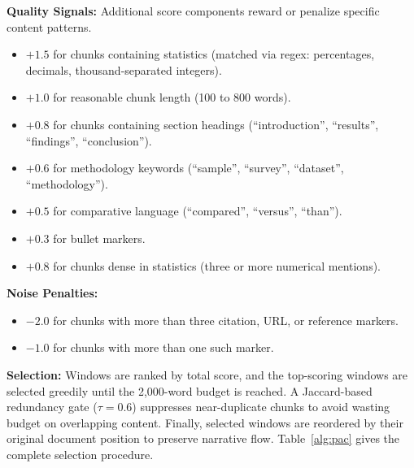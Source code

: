 \documentclass{ieeeaccess}
\begin{document}
\textbf{Quality Signals:} Additional score components reward or penalize specific content patterns.
\begin{itemize}
    \item $+1.5$ for chunks containing statistics (matched via regex: percentages, decimals, thousand-separated integers).
    \item $+1.0$ for reasonable chunk length (100 to 800 words).
    \item $+0.8$ for chunks containing section headings (``introduction'', ``results'', ``findings'', ``conclusion'').
    \item $+0.6$ for methodology keywords (``sample'', ``survey'', ``dataset'', ``methodology'').
    \item $+0.5$ for comparative language (``compared'', ``versus'', ``than'').
    \item $+0.3$ for bullet markers.
    \item $+0.8$ for chunks dense in statistics (three or more numerical mentions).
\end{itemize}

\textbf{Noise Penalties:}
\begin{itemize}
    \item $-2.0$ for chunks with more than three citation, URL, or reference markers.
    \item $-1.0$ for chunks with more than one such marker.
\end{itemize}

\textbf{Selection:} Windows are ranked by total score, and the top-scoring windows are selected greedily until the 2,000-word budget is reached. A Jaccard-based redundancy gate ($\tau = 0.6$) suppresses near-duplicate chunks to avoid wasting budget on overlapping content. Finally, selected windows are reordered by their original document position to preserve narrative flow. Table~\ref{alg:pac} gives the complete selection procedure.
\end{document}
